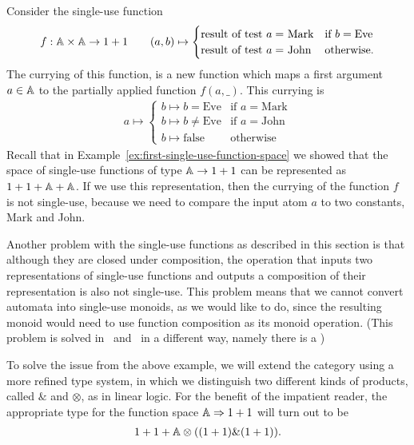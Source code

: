 \begin{example}
    Consider  the single-use function
    \begin{align*}
    f : \mathbb A \times \mathbb A \to 1 + 1 \qquad (a,b)  
    \mapsto \begin{cases}
        \text{result of test $a = $ Mark} & \text{if } b = \text{Eve} \\
        \text{result of test $a = $ John} & \text{otherwise}.
        \end{cases}
    \end{align*}
The currying of this function, is a new function which  maps a first argument $a \in \mathbb A$ to the partially applied function $f(a,\_)$. This currying is
\begin{align*}
    a \mapsto \begin{cases}
        b \mapsto b = \text{Eve} & \text{if } a = \text{Mark} \\
        b \mapsto b \neq \text{Eve} & \text{if } a = \text{John} \\
        b \mapsto \text{false} & \text{otherwise}
        \end{cases}
\end{align*}
Recall that in Example~\ref{ex:first-single-use-function-space} we showed that the space of single-use functions of type $\mathbb A \to 1 + 1$ can be represented as $1 + 1 + \mathbb A + \mathbb A$. If we use this representation,  then the currying of the function $f$  is not single-use, because we need to compare the input atom $a$ to two constants, Mark and John. 
\end{example}

Another problem with the single-use functions as described in this section is that although they are closed under composition, the operation that inputs two representations of single-use functions and outputs a composition of their representation is also not single-use. This problem means that we cannot convert automata into single-use monoids, as we would like to do, since the resulting monoid would need to use function composition as its monoid operation. (This problem is solved in~\cite{bojanczykstefanski2020} and~\cite{stefanski-phd} in a different way, namely there is a )

To solve the issue from the above example, we will  extend the category using a more refined type system, in which we distinguish two different kinds of products, called $\&$ and $\otimes$, as in linear logic. For the  benefit of the impatient reader,   the appropriate type for the function space $\mathbb A \Rightarrow 1+1$ will turn out to be 
\begin{align*}
1 + 1 + \mathbb A \otimes ((1+1) \& (1+1)).
\end{align*}

